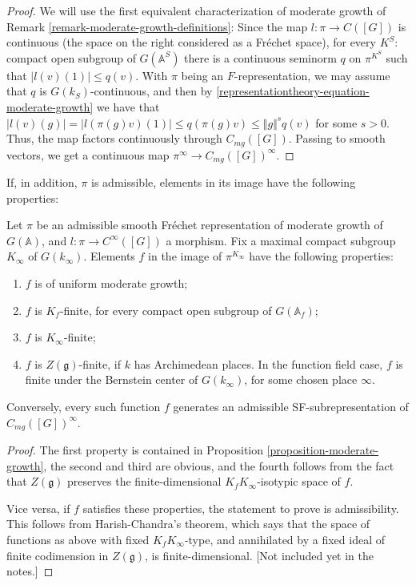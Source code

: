 \begin{proof}
 We will use the first equivalent characterization of moderate growth of Remark \ref{remark-moderate-growth-definitions}: Since the map $l:\pi\to C([G])$ is continuous (the space on the right considered as a Fr\'echet space), for every $K^S$: compact open subgroup of $G(\mathbb A^S)$ there is a continuous seminorm $q$ on $\pi^{K^S}$ such that $|l(v)(1)| \le q(v)$. With $\pi$ being an $F$-representation, we may assume that $q$ is $G(k_S)$-continuous, and then by \eqref{representationtheory-equation-moderate-growth} we have that $|l(v)(g)| = |l(\pi(g)v)(1)| \le q(\pi(g)v) \le \Vert g\Vert^s q(v)$ for some $s>0$. Thus, the map factors continuously through $C_{mg}([G])$. Passing to smooth vectors, we get a continuous map $\pi^\infty \to C_{mg}([G])^\infty$.
\end{proof}

If, in addition, $\pi$ is admissible, elements in its image have the following properties:

\begin{proposition}
 \label{proposition-admissible-moderate-growth}
Let $\pi$ be an admissible smooth Fr\'echet representation of moderate growth of $G(\mathbb A)$, and $l:\pi \to C^\infty([G])$ a morphism. Fix a maximal compact subgroup $K_\infty$ of $G(k_\infty)$. Elements $f$ in the image of $\pi^{K_\infty}$ have the following properties:
\begin{enumerate}
 \item $f$ is of uniform moderate growth;
 \item $f$ is $K_f$-finite, for every compact open subgroup of $G(\mathbb A_f)$;
 \item $f$ is $K_\infty$-finite;
 \item $f$ is $Z(\mathfrak g)$-finite, if $k$ has Archimedean places. In the function field case, $f$ is finite under the Bernstein center of $G(k_\infty)$, for some chosen place $\infty$.
\end{enumerate}
Conversely, every such function $f$ generates an admissible SF-subrepresentation of $C_{mg}([G])^\infty$.
\end{proposition}

\begin{proof}
 The first property is contained in Proposition \ref{proposition-moderate-growth}, the second and third are obvious, and the fourth follows from the fact that $Z(\mathfrak g)$ preserves the finite-dimensional $K_fK_\infty$-isotypic space of $f$. 
 
 Vice versa, if $f$ satisfies these properties, the statement to prove is admissibility. This follows from Harish-Chandra's theorem, which says that the space of functions as above with fixed $K_fK_\infty$-type, and annihilated by a fixed ideal of finite codimension in $Z(\mathfrak g)$, is finite-dimensional. [Not included yet in the notes.]
\end{proof}

